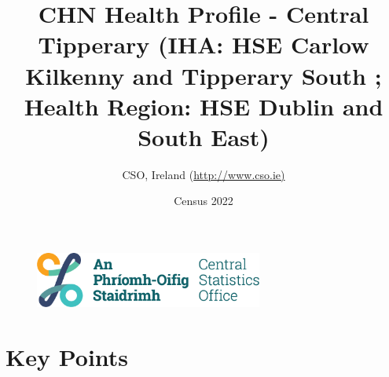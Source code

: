 \documentclass{article}
\title{CHN Health Profile - Central Tipperary (IHA: HSE Carlow Kilkenny and Tipperary South ;  Health Region: HSE Dublin and South East) }
\date{Census 2022}
\author{CSO, Ireland  (\url{http://www.cso.ie)}}
\begin{document}


\begin{figure}
	\centering
\includegraphics[width =75mm]{../figures/CSO_Logo.png}
\end{figure}

				 
		   
						  
														  
																																													
												 
			 
\maketitle
					
													   
				 
						 
																																																																											   
				 
				  
  \pagebreak
    	    \tableofcontents

\pagebreak


\section{Key Points}
\end{document}
